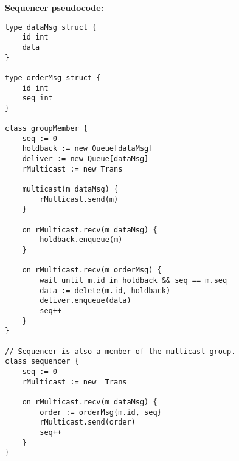 \documentclass{article}
\begin{document}
\textbf{Sequencer pseudocode:}
\begin{lstlisting}
type dataMsg struct {
	id int
	data
}

type orderMsg struct {
	id int
	seq int
}

class groupMember {
	seq := 0
	holdback := new Queue[dataMsg]
	deliver := new Queue[dataMsg]
	rMulticast := new Trans

	multicast(m dataMsg) {
		rMulticast.send(m)
	}

	on rMulticast.recv(m dataMsg) {
		holdback.enqueue(m)
	}

	on rMulticast.recv(m orderMsg) {
		wait until m.id in holdback && seq == m.seq
		data := delete(m.id, holdback)
		deliver.enqueue(data)
		seq++
	}
}

// Sequencer is also a member of the multicast group.
class sequencer {
	seq := 0
	rMulticast := new  Trans

	on rMulticast.recv(m dataMsg) {
		order := orderMsg{m.id, seq}
		rMulticast.send(order)
		seq++
	}
}
\end{lstlisting}
\end{document}
